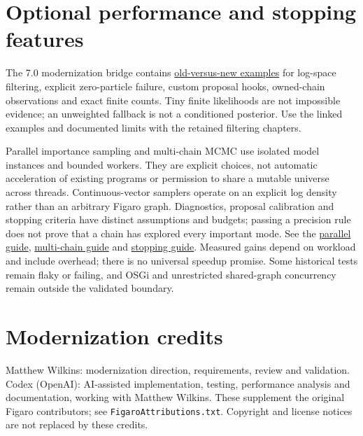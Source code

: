 \section*{Optional performance and stopping features}
The 7.0 modernization bridge contains
\href{https://github.com/mattwilkinsphoto/figaro/blob/main/docs/INFERENCE_INTEGRATION.md}{old-versus-new examples}
for log-space filtering, explicit zero-particle failure, custom proposal hooks,
owned-chain observations and exact finite counts. Tiny finite likelihoods are not
impossible evidence; an unweighted fallback is not a conditioned posterior. Use
the linked examples and documented limits with the retained filtering chapters.

Parallel importance sampling and multi-chain MCMC use isolated model instances
and bounded workers. They are explicit choices, not automatic acceleration of
existing programs or permission to share a mutable universe across threads.
Continuous-vector samplers operate on an explicit log density rather than an
arbitrary Figaro graph. Diagnostics, proposal calibration and stopping criteria
have distinct assumptions and budgets; passing a precision rule does not prove
that a chain has explored every important mode.
See the \href{https://github.com/mattwilkinsphoto/figaro/blob/main/docs/PARALLEL_PERFORMANCE.md}{parallel guide},
\href{https://github.com/mattwilkinsphoto/figaro/blob/main/docs/MULTI_CHAIN_MCMC.md}{multi-chain guide}
and \href{https://github.com/mattwilkinsphoto/figaro/blob/main/docs/STOPPING_CRITERIA.md}{stopping guide}.
Measured gains depend on workload and include overhead; there is no universal
speedup promise. Some historical tests remain flaky or failing, and OSGi and
unrestricted shared-graph concurrency remain outside the validated boundary.

\section*{Modernization credits}
Matthew Wilkins: modernization direction, requirements, review and validation.
Codex (OpenAI): AI-assisted implementation, testing, performance analysis and
documentation, working with Matthew Wilkins. These supplement the original
Figaro contributors; see \texttt{FigaroAttributions.txt}. Copyright and license
notices are not replaced by these credits.
